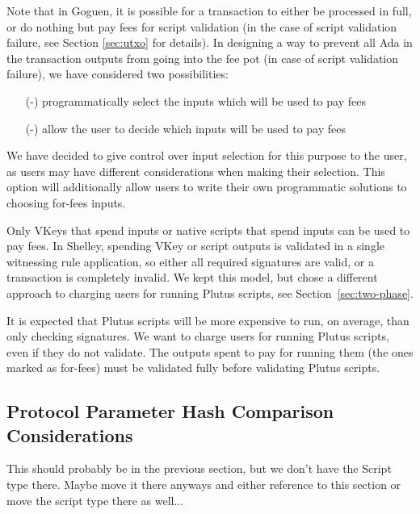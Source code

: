Note that in Goguen, it is possible for a transaction
to either be processed in full, or do nothing but pay fees for script
validation (in the case of script validation failure, see Section
\ref{sec:utxo} for details).
In designing a way to prevent all Ada in the transaction outputs from going into
the fee pot (in case of script validation failure), we have considered two
possibilities:

\begin{itemize}
  \item[(-)] programmatically select the inputs which will be used to pay fees
  \item[(-)] allow the user to decide which inputs will be used to pay fees
\end{itemize}

We have decided to give control over input selection for this purpose to the user,
as users may have different considerations when making their selection. This
option will additionally allow users to write their own programmatic solutions
to choosing for-fees inputs.

Only VKeys that spend inputs or native scripts that spend inputs can
be used to pay fees. In Shelley, spending VKey or script outputs is
validated in a single witnessing rule application, so either all
required signatures are valid, or a transaction is completely
invalid. We kept this model, but chose a different approach to
charging users for running Plutus scripts, see
Section~\ref{sec:two-phase}.

It is expected that Plutus scripts will be more expensive to run, on
average, than only checking signatures. We want to charge users for
running Plutus scripts, even if they do not validate. The outputs
spent to pay for running them (the ones marked as for-fees) must be
validated fully before validating Plutus scripts.

\subsection{Protocol Parameter Hash Comparison Considerations}

\begin{note}
  This should probably be in the previous section, but we don't have
  the Script type there. Maybe move it there anyways and either
  reference to this section or move the script type there as well...
\end{note}

